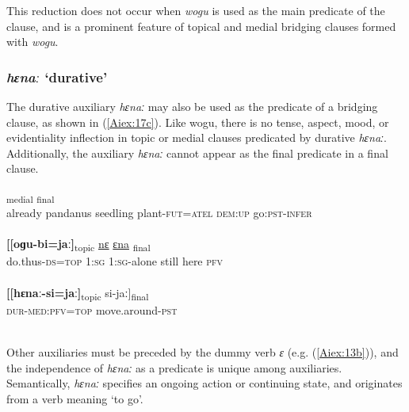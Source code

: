 \documentclass[output=paper]{LSP/langsci}
\begin{document}
This reduction does not occur when \textit{wogu} is used as the main predicate of the clause, and is a prominent feature of topical and medial bridging clauses formed with \textit{wogu}.


\subsubsection{\textit{hɛnaː} `durative'} 
\label{Aiaspect.hena}
The durative auxiliary \textit{hɛnaː} may also be used as the predicate of a bridging clause, as shown in (\ref{Aiex:17c}). Like wogu, there is no tense, aspect, mood, or evidentiality inflection in topic or medial clauses predicated by durative \textit{hɛnaː}. Additionally, the auxiliary \textit{hɛnaː} cannot appear as the final predicate in a final clause. 

\begin{exe}
\ex \label{Aiex:17ac}
\begin{xlist}
\ex \label{Aiex:17a}
\gll	[ɛimɛ	oɡa	ɛ	ɡɛ-mɛna=ta]\textsubscript{medial}	\underline{\smash{[holo}}	\underline{\smash{anɛ-obo]}}\textsubscript{final}\\
already	pandanus	seedling	plant-\textsc{fut=atel}	\textsc{dem:up}	go:\textsc{pst-infer}\\
\glt ‎\\
\ex \label{Aiex:17b}
\gll	\textbf{[[oɡu-bi=jaː]}\textsubscript{topic}	\underline{nɛ}	\underline{}	\underline{ɛna}	\underline{}	\underline{\smash{di]}}\textsubscript{final}\\
do.thus\textsc{-ds=top}	\textsc{1:sg}	\textsc{1:sg-}alone	still	here	\textsc{pfv}\\
\glt {}\\
\ex \label{Aiex:17c}
\gll	\textbf{[[hɛnaː-si=jaː]}\textsubscript{topic}	si-jaː]\textsubscript{final}\\
\textsc{dur-med:pfv=top}	move.around\textsc{-pst}\\
\glt	{}\\
\end{xlist}
\end{exe}


Other auxiliaries must be preceded by the dummy verb \textit{ɛ} (e.g. (\ref{Aiex:13b})), and the independence of \textit{hɛnaː} as a predicate is unique among auxiliaries. Semantically, \textit{hɛnaː} specifies an ongoing action or continuing state, and originates from a verb meaning `to go'.
\end{document}
